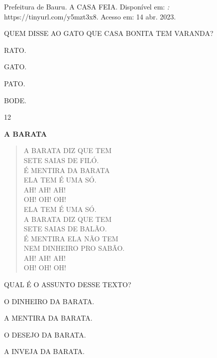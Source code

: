 Prefeitura de Bauru. A CASA FEIA. Disponível em: \emph: https://tinyurl.com/y5mzt3x8. Acesso em: 14 abr. 2023.
	

QUEM DISSE AO GATO QUE CASA BONITA TEM VARANDA? 

\begin{escolha}
\item RATO.

\item GATO.

\item PATO.

\item BODE.
\end{escolha}


\num{12}

\textbf{A BARATA}

\begin{verse}
A BARATA DIZ QUE TEM\\
SETE SAIAS DE FILÓ.\\
É MENTIRA DA BARATA\\
ELA TEM É UMA SÓ.\\
AH! AH! AH!\\
OH! OH! OH!\\
ELA TEM É UMA SÓ.\\
A BARATA DIZ QUE TEM\\
SETE SAIAS DE BALÃO.\\
É MENTIRA ELA NÃO TEM\\
NEM DINHEIRO PRO SABÃO.\\
AH! AH! AH!\\
OH! OH! OH!
\end{verse}


QUAL É O ASSUNTO DESSE TEXTO?

\begin{escolha}
\item O DINHEIRO DA BARATA.

\item A MENTIRA DA BARATA.

\item O DESEJO DA BARATA.

\item A INVEJA DA BARATA.
\end{escolha}


